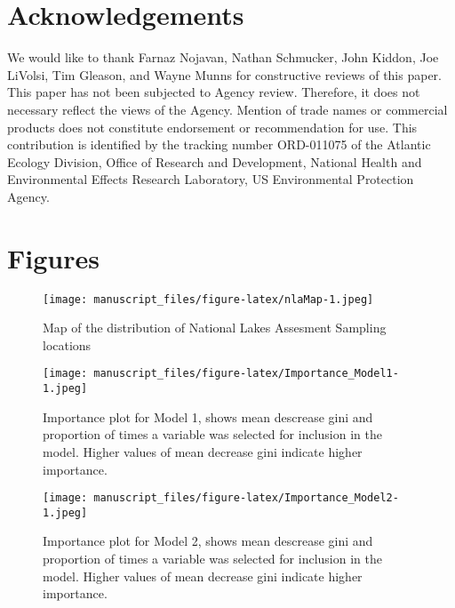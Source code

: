 \documentclass[11pt,]{article}
\begin{document}
\section{Acknowledgements}\label{acknowledgements}

We would like to thank Farnaz Nojavan, Nathan Schmucker, John Kiddon,
Joe LiVolsi, Tim Gleason, and Wayne Munns for constructive reviews of
this paper. This paper has not been subjected to Agency review.
Therefore, it does not necessary reflect the views of the Agency.
Mention of trade names or commercial products does not constitute
endorsement or recommendation for use. This contribution is identified
by the tracking number ORD-011075 of the Atlantic Ecology Division,
Office of Research and Development, National Health and Environmental
Effects Research Laboratory, US Environmental Protection Agency.

\newpage

\section{Figures}\label{figures}

\begin{figure}[htbp]
\centering
\texttt{[image: manuscript\_files/figure-latex/nlaMap-1.jpeg]}
\caption{Map of the distribution of National Lakes Assesment Sampling
locations\label{fig:nlaMap}}
\end{figure}

\newpage

\begin{figure}[htbp]
\centering
\texttt{[image: manuscript\_files/figure-latex/Importance\_Model1-1.jpeg]}
\caption{Importance plot for Model 1, shows mean descrease gini and
proportion of times a variable was selected for inclusion in the model.
Higher values of mean decrease gini indicate higher importance.
\label{fig:Importance_Model1}}
\end{figure}

\newpage

\begin{figure}[htbp]
\centering
\texttt{[image: manuscript\_files/figure-latex/Importance\_Model2-1.jpeg]}
\caption{Importance plot for Model 2, shows mean descrease gini and
proportion of times a variable was selected for inclusion in the model.
Higher values of mean decrease gini indicate higher importance.
\label{fig:Importance_Model2}}
\end{figure}

\newpage
\end{document}
